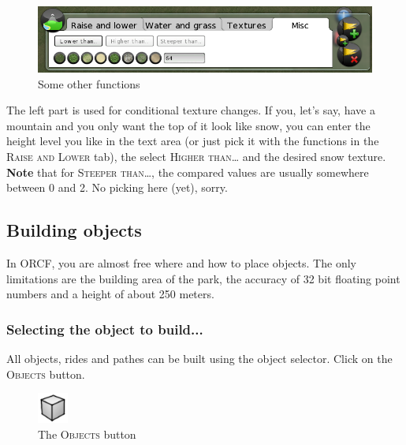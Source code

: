\documentclass[a4paper]{article}
\newcommand{\ccaption}[1]{\textsc{#1}}
\newcommand{\note}[1]{\textbf{Note} #1 \par}
\begin{document}
\begin{figure}[h]
  \begin{center}
    \includegraphics[width=140mm]{./images/terrain-04.png}
  \end{center}
  \caption{Some other functions}
\end{figure}

The left part is used for conditional texture changes. If you, let's say, have a mountain and you only want the top of it look like snow,
you can enter the height level you like in the text area (or just pick it with the functions in the \ccaption{Raise and Lower} tab),
the select \ccaption{Higher than\dots} and the desired snow texture.
\note{that for \ccaption{Steeper than\dots}, the compared values are usually somewhere between 0 and 2. No picking here (yet), sorry.}

\subsection{Building objects}
In ORCF, you are almost free where and how to place objects. The only limitations are the building area of the park, the accuracy of
32 bit floating point numbers and a height of about 250 meters.

\subsubsection{Selecting the object to build...}
All objects, rides and pathes can be built using the object selector. Click on the \ccaption{Objects} button.
\begin{figure}[h]
  \begin{center}
    \includegraphics[width=10mm]{../images/park-objects.png}
  \end{center}
  \caption{The \ccaption{Objects} button}
\end{figure}
\end{document}
